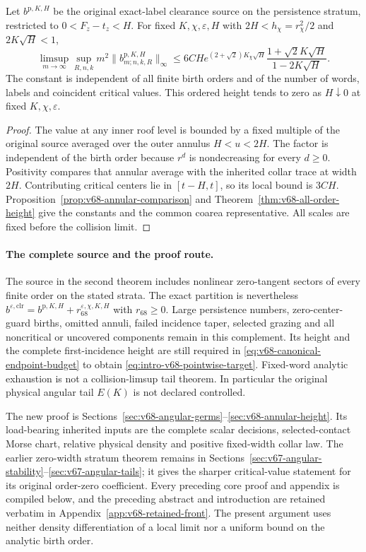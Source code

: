 \begin{leadtheorem}
\label{thm:intro-v68-height}
Let $b^{\mathrm p,K,H}$ be the original exact-label clearance source
on the persistence stratum, restricted to $0<F_z-t_z<H$. For fixed
$K,\chi,\varepsilon,H$ with $2H<h_\chi=r_\chi^2/2$ and
$2K\sqrt H<1$,
\[
 \limsup_{m\to\infty}\sup_{R,n,k}
          m^2\|b^{\mathrm p,K,H}_{m;n,k,R}\|_\infty
 \le6CH e^{(2+\sqrt2)K_\chi\sqrt H}
                     \frac{1+\sqrt2K\sqrt H}{1-2K\sqrt H}.
\]
The constant is independent of all finite birth orders and of the
number of words, labels and coincident critical values. This ordered
height tends to zero as $H\downarrow0$ at fixed $K,\chi,\varepsilon$.
\end{leadtheorem}
\begin{proof}
The value at any inner roof level is bounded by a fixed multiple of
the original source averaged over the outer annulus $H<u<2H$.
The factor is independent of the birth order because $r^d$ is
nondecreasing for every $d\ge0$. Positivity compares that annular
average with the inherited collar trace at width $2H$. Contributing
critical centers lie in $[t-H,t]$, so its local bound is $3CH$.
Proposition~\ref{prop:v68-annular-comparison} and
Theorem~\ref{thm:v68-all-order-height} give the constants and the
common coarea representative. All scales are fixed before the
collision limit.
\end{proof}

\paragraph{The complete source and the proof route.}
The source in the second theorem includes nonlinear zero-tangent
sectors of every finite order on the stated strata. The exact partition
is nevertheless
$b^{\varepsilon,\mathrm{clr}}=b^{\mathrm p,K,H}
+r_{68}^{\varepsilon,\chi,K,H}$ with $r_{68}\ge0$.
Large persistence numbers, zero-center-guard births, omitted annuli,
failed incidence taper, selected grazing and all noncritical or
uncovered components remain in this complement. Its height and the
complete first-incidence height are still required in
\eqref{eq:v68-canonical-endpoint-budget} to obtain
\eqref{eq:intro-v68-pointwise-target}. Fixed-word analytic exhaustion
is not a collision-limsup tail theorem. In particular the original
physical angular tail $E(K)$ is not declared controlled.

The new proof is Sections~\ref{sec:v68-angular-germs}--\ref{sec:v68-annular-height}.
Its load-bearing inherited inputs are the complete scalar decisions,
selected-contact Morse chart, relative physical density and positive
fixed-width collar law. The earlier zero-width stratum theorem remains
in Sections~\ref{sec:v67-angular-stability}--\ref{sec:v67-angular-tails};
it gives the sharper critical-value statement for its original
order-zero coefficient. Every preceding core proof and appendix is
compiled below, and the preceding abstract and introduction are retained
verbatim in Appendix~\ref{app:v68-retained-front}. The present argument
uses neither density differentiation of a local limit nor a uniform
bound on the analytic birth order.

